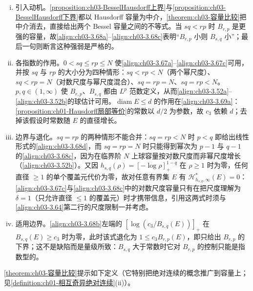 \documentclass[../../main.tex]{subfiles}%
\begin{document}
\begin{remark}\label{remark:ch03-容量比较动机}
\begin{enumerate}[(i)]
\item 引入动机。\cref{proposition:ch03-BesselHausdorff上界}与\cref{proposition:ch03-BesselHausdorff下界}都以 Hausdorff 容量为中介，\cref{theorem:ch03-容量比较}把中介消去，直接给出两个 Bessel 容量之间的不等式。当 $sq<rp$ 时 $B_{r,p}$ 是更强的容量，故\eqref{align:ch03-3.68a}--\eqref{align:ch03-3.68c}表明“$B_{r,p}$ 小则 $B_{s,q}$ 小”；最后一句则断言这种强弱是严格的。
\item 各指数的作用。$0<sq\leqslant rp\leqslant N$ 使\eqref{align:ch03-3.67a}--\eqref{align:ch03-3.67c}可用，并按 $sq$ 与 $rp$ 的大小分为四种情形：$sq<rp<N$（两个幂尺度）、$sq<rp=N$（对数尺度与幂尺度混合）、$sq=rp=N$、$sq=rp<N$。$p,q\in(1,\infty)$ 使 $B_{r,p}$、$B_{s,q}$ 都由 $L^p$ 范数定义，从而\eqref{align:ch03-3.52a}--\eqref{align:ch03-3.52b}的球估计可用。$\operatorname{diam}E\leqslant d$ 的作用在\eqref{align:ch03-3.69a}：\cref{proposition:ch01-Hausdorff局部等价}的常数以 $d/2$ 为参数，故 $c_3$ 依赖 $d$；去掉该假设时常数随 $E$ 的直径增长。
\item 边界与退化。$sq=rp$ 的两种情形不能合并：$sq=rp<N$ 时 $p<q$ 即给出线性形式的\eqref{align:ch03-3.68d}，而 $sq=rp=N$ 时只能得到幂次为 $p-1$ 与 $q-1$ 的\eqref{align:ch03-3.68c}，因为在临界阶 $N$ 上球容量按对数尺度而非幂尺度增长（\eqref{align:ch03-3.52b}）。又因 $h_{s,q}(\rho)=[-\log\rho]_+^{1-q}$ 在 $\rho\geqslant1$ 时为零，任何直径 $\geqslant1$ 的单个覆盖元代价为零，故对任意有界集 $E$ 有 $\mathcal{H}^*_{h_{s,q},\infty}(E)=0$：\eqref{align:ch03-3.67c}与\eqref{align:ch03-3.68c}中的对数尺度容量只有在把尺度理解为 $\delta=1$（只允许直径 $\leqslant1$ 的覆盖元）时才携带信息，引用这两式时须与\eqref{align:ch03-3.64}第二行的尺度限制一并考虑。
\item 适用边界。\eqref{align:ch03-3.68b}左端的 $[\log(c_3/B_{s,q}(E))]_+$ 在 $B_{s,q}(E)\geqslant c_3$ 时为零，此时该式退化为 $1\leqslant c_3B_{r,p}(E)$，即只给出 $B_{r,p}$ 的下界；这不是缺陷而是量级所致：$B_{s,q}$ 大于常数时它对 $B_{r,p}$ 的控制只能是指数型的。
\end{enumerate}
\end{remark}

\cref{theorem:ch03-容量比较}提示如下定义（它特别把绝对连续的概念推广到容量上；见\cref{definition:ch01-相互奇异绝对连续}(ii)）。
\end{document}
